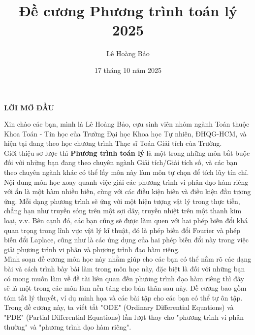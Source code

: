 \documentclass[10pt, a4paper]{article}
\title{\color{red}\textbf{Đề cương Phương trình toán lý 2025}}
\author{\color{red}Lê Hoàng Bảo}
\date{\color{red}17 tháng 10 năm 2025}
\begin{document}
	\pagestyle{fancy}
	\fancyhead{} %
	\fancyfoot{} %
	\fancyfoot[C]{\textbf\thepage}
	\renewcommand{\headrulewidth}{0.6pt}
	\renewcommand{\footrulewidth}{0.6pt}
	\renewcommand{\refname}{Tài liệu tham khảo}
	\maketitle\thispagestyle{empty}
	\newpage\thispagestyle{empty}
	\begin{center}
		\LARGE \textbf{LỜI MỞ ĐẦU}
	\end{center}
	
	Xin chào các bạn, mình là Lê Hoàng Bảo, cựu sinh viên nhóm ngành Toán thuộc Khoa Toán - Tin học của Trường Đại học Khoa học Tự nhiên, ĐHQG-HCM, và hiện tại đang theo học chương trình Thạc sĩ Toán Giải tích của Trường.\\
	
	Giới thiệu sơ lược thì \textbf{Phương trình toán lý} là một trong những môn bắt buộc đối với những bạn đang theo chuyên ngành Giải tích/Giải tích số, và các bạn theo chuyên ngành khác có thể lấy môn này làm môn tự chọn để tích lũy tín chỉ. Nội dung môn học xoay quanh việc giải các phương trình vi phân đạo hàm riêng với ẩn là một hàm nhiều biến, cùng với các điều kiện biên và điều kiện đầu tương ứng. Mỗi dạng phương trình sẽ ứng với một hiện tượng vật lý trong thực tiễn, chẳng hạn như truyền sóng trên một sợi dây, truyền nhiệt trên một thanh kim loại, v.v. Bên cạnh đó, các bạn cũng sẽ được làm quen với hai phép biến đổi khá quan trọng trong lĩnh vực vật lý kĩ thuật, đó là phép biến đổi Fourier và phép biến đổi Laplace, cũng như là các ứng dụng của hai phép biến đổi này trong việc giải phương trình vi phân và phương trình đạo hàm riêng.\\
	
	Mình soạn đề cương môn học này nhằm giúp cho các bạn có thể nắm rõ các dạng bài và cách trình bày bài làm trong môn học này, đặc biệt là đối với những bạn có mong muốn làm về đề tài liên quan đến phương trình đạo hàm riêng thì đây sẽ là một trong các môn làm nền tảng cho bản thân sau này. Đề cương bao gồm tóm tắt lý thuyết, ví dụ minh họa và các bài tập cho các bạn có thể tự ôn tập. Trong đề cương này, ta viết tắt "ODE" (Ordinary Differential Equations) và "PDE" (Partial Differential Equations) lần lượt thay cho "phương trình vi phân thường" và "phương trình đạo hàm riêng".\\
	
\end{document}
